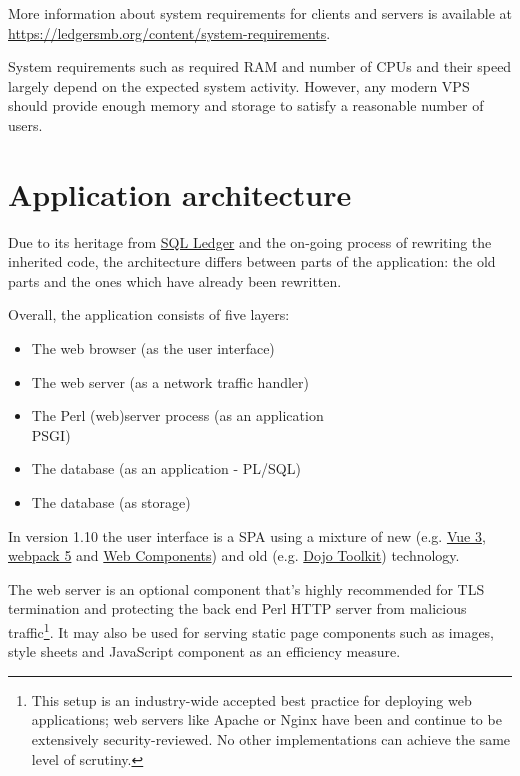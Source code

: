 More information about system requirements for clients and servers is available at
\href{https://ledgersmb.org/content/system-requirements}{https://ledgersmb.org/content/system-requirements}.

System requirements such as required RAM and number of CPUs and their speed
largely depend on the expected system activity. However, any modern \acrshort{VPS} should provide enough memory and storage to satisfy a reasonable number of users.

\section{Application architecture}
\label{sec-ledgersmb-architecture}

Due to its heritage from \href{https://sql-ledger.com/}{SQL Ledger} and the on-going process of rewriting
the inherited code, the architecture differs between parts
of the application: the old parts and the ones which have already been
rewritten.

Overall, the application consists of five layers:

\begin{itemize}
\item The web browser (as the user interface)
\item The web server (as a network traffic handler)
\item The Perl (web)server process (as an application \\ \gls{PSGI})
\item The database (as an application - \gls{PL/SQL})
\item The database (as storage)
\end{itemize}

In version 1.10 the user interface is a \gls{SPA} using a mixture of new (e.g. 
\href{https://vuejs.org/}{Vue 3},
\href{https://webpack.js.org/}{webpack 5} and \href{https://developer.mozilla.org/en-US/docs/Web/Web_Components}{Web Components}) and old (e.g. \href{https://dojotoolkit.org/}{Dojo Toolkit}) technology.

The web server is an optional component that's highly recommended for TLS termination
and protecting the back end Perl HTTP server from malicious traffic\footnote{This setup is an industry-wide accepted best practice for deploying web applications; web servers like Apache or Nginx have been and continue to be extensively security-reviewed. No other implementations can achieve the same level of scrutiny.}. It may also be used
for serving static page components such as images, style sheets and JavaScript component as an efficiency measure.

